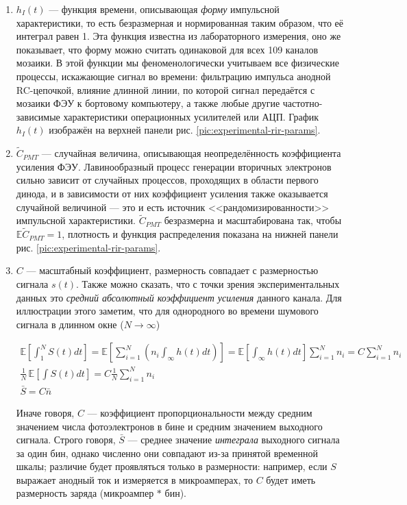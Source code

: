 \begin{enumerate}
	\item $h_I(t)$ --- функция времени, описывающая \textit{форму} импульсной характеристики, то есть безразмерная и нормированная таким образом, что её интеграл равен 1. Эта функция известна из лабораторного измерения, оно же показывает, что форму можно считать одинаковой для всех 109 каналов мозаики. В этой функции мы феноменологически учитываем все физические процессы, искажающие сигнал во времени: фильтрацию импульса анодной RC-цепочкой, влияние длинной линии, по которой сигнал передаётся с мозаики ФЭУ к бортовому компьютеру, а также любые другие частотно-зависимые характеристики операционных усилителей или АЦП. График $h_I(t)$ изображён на верхней панели рис. \ref{pic:experimental-rir-params}.
	\item $\tilde{C}_{PMT}$ --- случайная величина, описывающая неопределённость коэффициента усиления ФЭУ. Лавинообразный процесс генерации вторичных электронов сильно зависит от случайных процессов, проходящих в области первого динода, и в зависимости от них коэффициент усиления также оказывается случайной величиной --- это и есть источник <<рандомизированности>> импульсной характеристики. $\tilde{C}_{PMT}$ безразмерна и масштабирована так, чтобы $\mathbb{E} \tilde{C}_{PMT} = 1$, плотность и функция распределения показана на нижней панели рис. \ref{pic:experimental-rir-params}.
	\item $C$ --- масштабный коэффициент, размерность совпадает с размерностью сигнала $s(t)$. Также можно сказать, что с точки зрения экспериментальных данных это \textit{средний абсолютный коэффициент усиления} данного канала. Для иллюстрации этого заметим, что для однородного во времени шумового сигнала в длинном окне ($N \rightarrow \infty$)
	
	\begin{equation}
		\label{eq:C-coeff-description}
		\begin{gathered}
			\mathbb{E} \left[ \int_{1}^{N} S(t) dt \right] = \mathbb{E} \left[ \sum_{i=1}^{N} \left( n_i \int_{\infty} h(t) dt \right) \right] = \mathbb{E} \left[ \int_{\infty} h(t) dt \right] \sum_{i=1}^{N} n_i = C \sum_{i=1}^{N} n_i \\
			\frac{1}{N} \, \mathbb{E} \left[ \int S(t) dt \right] = C \frac{1}{N} \sum_{i=1}^{N} n_i \\
			\bar{S} = C \bar{n}
		\end{gathered}
	\end{equation}
	
	Иначе говоря, $C$ --- коэффициент пропорциональности между средним значением числа фотоэлектронов в бине и средним значением выходного сигнала. Строго говоря, $\bar{S}$ --- среднее значение \textit{интеграла} выходного сигнала за один бин, однако численно они совпадают из-за принятой временной шкалы; различие будет проявляться только в размерности: например, если $S$ выражает анодный ток и измеряется в микроамперах, то $C$ будет иметь размерность заряда (микроампер $*$ бин).
	
\end{enumerate}

